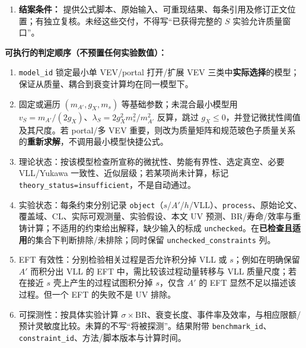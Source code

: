 \documentclass[
]{article}
\providecommand{\tightlist}{%
  \setlength{\itemsep}{0pt}\setlength{\parskip}{0pt}}
\begin{document}
\begin{enumerate}
  benchmark 表与一个标清假设的
  \texttt{(m\_\{A\textquotesingle{}\},g\_X)} 条件性切片；在 portal
  影响显著时应另配物理标量质量与混合参数的图，绝不可将未混合的
  \texttt{(m\_s,λ\_\{HS\})} 关系直接等同物理质量谱。 \textbf{Major 1.3
  的联合扫描附加列（仅对 portal 已纳入的模型和适用能标）：} 记录
  \texttt{lambda\_HS(mu0)}、重整化方案与尺度、重 VLL
  阈值及独立轻轻子二点函数、\(h_1/h_2\)
  的物理质量/宽度、是否为近简并双态、该过程采用的混合角或完整传播幅度、Higgs
  rate/BR/实验 ID。若模型仅固定 \(\lambda_{HS}=0\)
  而未计算辐射稳定性，标记
  \texttt{portal\_assumption\_unverified}，不得据此将 Higgs
  限制栏置为``已证明不适用''；更不可直接使用 §2.2.1
  的未混合标量质量上界对混合物理态逐个裁切（详见 §2.5.1 E/F）。
\item
  \textbf{结案条件：}
  提供公式脚本、原始输入、可重现结果、每条引用及修订正文位置；有独立复核。未经这些交付，不得写``已获得完整的
  \(S\) 实验允许质量窗口''。
\end{enumerate}

\textbf{可执行的判定顺序（不预置任何实验数值）：}

\begin{enumerate}
\def\labelenumi{\arabic{enumi}.}
\tightlist
\item
  \texttt{model\_id} 锁定最小单 VEV/portal 打开/扩展 VEV
  三类中\textbf{实际选择}的模型；保证从质量、耦合到衰变计算均在同一模型下。
\item
  固定或遍历 \((m_{A'},g_X,m_s)\) 等基础参数；未混合最小模型用
  \(v_S=m_{A'}/(2g_X)\)、\(\lambda_S=2g_X^2m_s^2/m_{A'}^2\) 反算，跳过
  \(g_X\leq0\)，并登记微扰性阈值及其尺度。若 portal/多 VEV
  重要，则改为质量矩阵和规范玻色子质量关系的\textbf{重新求解}，不调用最小模型快捷公式。
\item
  理论状态：按该模型检查所宣称的微扰性、势能有界性、选定真空、必要
  VLL/Yukawa 一致性、近似层级；若某项尚未计算，标记
  \texttt{theory\_status=insufficient}，不是自动通过。
\item
  实验状态：每条约束分别记录
  \texttt{object}（\(s\)/\(A'\)/\(h\)/VLL）、\texttt{process}、原始论文、覆盖域、CL、实际可观测量、实验假设、本文
  UV 预测、BR/寿命/效率与重铸计算；不适用的约束给出解释，缺少输入的标成
  \texttt{unchecked}。在\textbf{已检查且适用}的集合下判断排除/未排除；同时保留
  \texttt{unchecked\_constraints} 列。
\item
  EFT 有效性：分别检验相关过程是否允许积分掉 VLL 或
  \(s\)；例如在明确保留 \(A'\) 而积分出 VLL 的 EFT
  中，需比较该过程动量转移与 VLL 质量尺度；若在接近 \(s\)
  壳上产生的过程试图积分掉 \(s\)，仅含 \(A'\) 的 EFT
  显然不足以描述该过程。但一个 EFT 的失败不是 UV 排除。
\item
  可探测性：按具体实验计算
  \(\sigma\times\mathrm{BR}\)、衰变长度、事件率及效率，与相应限额/预计灵敏度比较。未算的不写``将被探测''。结果附带
  \texttt{benchmark\_id}、\texttt{constraint\_id}、方法/脚本版本与计算时间。
\end{enumerate}
\end{document}
